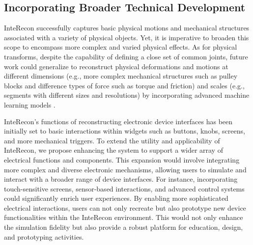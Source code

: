 \subsection{Incorporating Broader Technical Development}
InteRecon successfully captures basic physical motions and mechanical structures associated with a variety of physical objects. 
Yet, it is imperative to broaden this scope to encompass more complex and varied physical effects. 
As for physical transforms, despite the capability of defining a close set of common joints, future work could generalize to reconstruct physical deformations and motions at different dimensions (e.g., more complex mechanical structures such as pulley blocks and difference types of force such as torque and friction) and scales (e.g., segments with different sizes and resolutions) by incorporating advanced machine learning models \cite{ ao2023gesturediffuclip, lesser2022loki}. 

InteRecon's functions of reconstructing electronic device interfaces has been initially set to basic interactions within widgets such as buttons, knobs, screens, and more mechanical triggers. 
To extend the utility and applicability of InteRecon, we propose enhancing the system to support a wider array of electrical functions and components. 
This expansion would involve integrating more complex and diverse electronic mechanisms, allowing users to simulate and interact with a broader range of device interfaces. 
For instance, incorporating touch-sensitive screens, sensor-based interactions, and advanced control systems \cite{tatzgern2022airres, liao2022realitytalk, kim2022spinocchietto} could significantly enrich user experiences. 
By enabling more sophisticated electrical interactions, users can not only recreate but also prototype new device functionalities within the InteRecon environment. 
This would not only enhance the simulation fidelity but also provide a robust platform for education, design, and prototyping activities.




